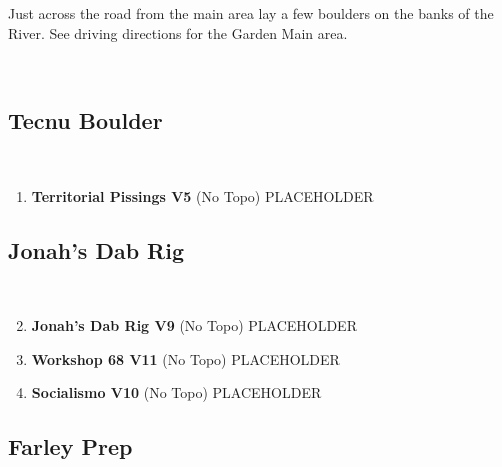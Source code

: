 \begin{multicols*}{2}
Just across the road from the main area lay a few boulders on the banks of the River. See driving directions for the Garden Main area.

	\
			\subsection*{Tecnu Boulder}\label{bf:Tecnu Boulder}
			\
			
				\begin{enumerate}[]
					\setcounter{enumi}{0}
					\item\label{rt:Territorial Pissings} \colorbox{RoyalBlue!20}{\textbf{Territorial Pissings V5  } }
						\newline (No Topo) 
					\newline PLACEHOLDER\
				\end{enumerate}
			\subsection*{Jonah's Dab Rig}\label{bf:Jonah's Dab Rig}
			\
			
				\begin{enumerate}[]
					\setcounter{enumi}{1}
					\item\label{rt:Jonah's Dab Rig} \colorbox{Goldenrod!50}{\textbf{Jonah's Dab Rig V9  } }
						\newline (No Topo) 
					\newline PLACEHOLDER\
					\setcounter{enumi}{2}
					\item\label{rt:Workshop 68} \colorbox{red!20}{\textbf{Workshop 68 V11  } }
						\newline (No Topo) 
					\newline PLACEHOLDER\
					\setcounter{enumi}{3}
					\item\label{rt:Socialismo} \colorbox{red!20}{\textbf{Socialismo V10  } }
						\newline (No Topo) 
					\newline PLACEHOLDER\
				\end{enumerate}
			\subsection*{Farley Prep}\label{bf:Farley Prep}
			\
			

\end{multicols*}
